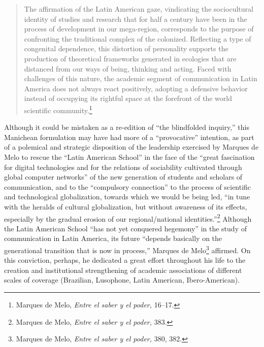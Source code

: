 \documentclass{tufte-handout}
\begin{document}
\begin{quote}
The affirmation of the Latin American gaze, vindicating the
sociocultural identity of studies and research that for half a century
have been in the process of development in our mega-region, corresponds
to the purpose of confronting the traditional complex of the colonized.
Reflecting a type of congenital dependence, this distortion of
personality supports the production of theoretical frameworks generated
in ecologies that are distanced from our ways of being, thinking and
acting. Faced with challenges of this nature, the academic segment of
communication in Latin America does not always react positively,
adopting a defensive behavior instead of occupying its rightful space at
the forefront of the world scientific community.\footnote{Marques de
  Melo, \emph{Entre el saber y el poder,} 16--17.}
\end{quote}

\noindent Although it could be mistaken as a re-edition of ``the blindfolded
inquiry,'' this Manichean formulation may have had more of a
``provocative'' intention, as part of a polemical and strategic
disposition of the leadership exercised by Marques de Melo to rescue the
``Latin American School'' in the face of the ``great fascination for
digital technologies and for the relations of sociability cultivated
through global computer networks'' of the new generation of students and
scholars of communication, and to the ``compulsory connection'' to the
process of scientific and technological globalization, towards which we
would be being led, ``in tune with the heralds of cultural
globalization, but without awareness of its effects, especially by the
gradual erosion of our regional/national identities.''\footnote{Marques
  de Melo, \emph{Entre el saber y el poder,} 383.} Although the Latin
American School ``has not yet conquered hegemony'' in the study of
communication in Latin America, its future ``depends basically on the
generational transition that is now in process,'' Marques de
Melo\footnote{Marques de Melo, \emph{Entre el saber y el poder,} 380,
  382.} affirmed. On this conviction, perhaps, he dedicated a great
effort throughout his life to the creation and institutional
strengthening of academic associations of different scales of coverage
(Brazilian, Lusophone, Latin American, Ibero-American).
\end{document}

